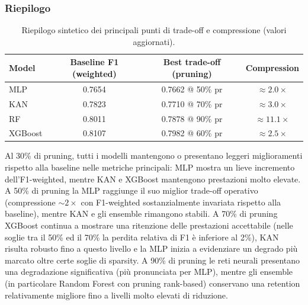 \documentclass[a4paper,12pt]{report}
\begin{document}
	\subsubsection{Riepilogo}
	\begin{table}[H]
		\centering
		\begin{tabular}{lccc}
			\toprule
			\textbf{Model} & \textbf{Baseline F1 (weighted)} & \textbf{Best trade-off (pruning)} & \textbf{Compression} \\
			\midrule
			MLP      & 0.7654 & 0.7662 @ 50\% pr & $\approx 2.0\times$ \\
			KAN      & 0.7823 & 0.7710 @ 70\% pr & $\approx 3.0\times$ \\
			RF       & 0.8011 & 0.7878 @ 90\% pr & $\approx 11.1\times$ \\
			XGBoost  & 0.8107 & 0.7982 @ 60\% pr & $\approx 2.5\times$ \\
			\bottomrule
		\end{tabular}
		\caption{Riepilogo sintetico dei principali punti di trade-off e compressione (valori aggiornati).}
	\end{table}
	
	Al 30\% di pruning, tutti i modelli mantengono o presentano leggeri miglioramenti rispetto alla baseline nelle metriche principali: MLP mostra un lieve incremento dell'F1-weighted, mentre KAN e XGBoost mantengono prestazioni molto elevate. A 50\% di pruning la MLP raggiunge il suo miglior trade-off operativo (compressione $\sim 2\times$ con F1-weighted sostanzialmente invariata rispetto alla baseline), mentre KAN e gli ensemble rimangono stabili. A 70\% di pruning XGBoost continua a mostrare una ritenzione delle prestazioni accettabile (nelle soglie tra il 50\% ed il 70\% la perdita relativa di F1 è inferiore al 2\%), KAN risulta robusto fino a questo livello e la MLP inizia a evidenziare un degrado più marcato oltre certe soglie di sparsity. A 90\% di pruning le reti neurali presentano una degradazione significativa (più pronunciata per MLP), mentre gli ensemble (in particolare Random Forest con pruning rank-based) conservano una retention relativamente migliore fino a livelli molto elevati di riduzione.
	
\end{document}
